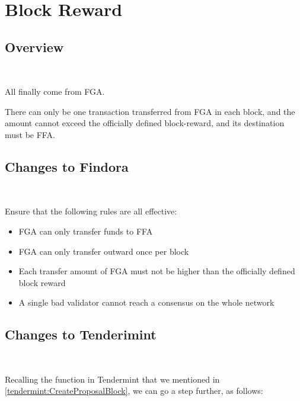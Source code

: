 \clearpage

\section{Block Reward} \label{section:reward}

\subsection{Overview}

~\par

All  finally come from FGA.

There can only be one transaction transferred from FGA in each block,
and the amount cannot exceed the officially defined block-reward,
and its destination must be FFA.

\subsection{Changes to Findora}

~\par

Ensure that the following rules are all effective:

\begin{itemize}
    \item FGA can only transfer funds to FFA
    \item FGA can only transfer outward once per block
    \item Each transfer amount of FGA must not be higher than the officially defined block reward
    \item A single bad validator cannot reach a consensus on the whole network
\end{itemize}

\clearpage

\subsection{Changes to Tenderimint}

~\par

Recalling the  function in Tendermint that we mentioned in \ref{tendermint:CreateProposalBlock},
we can go a step further, as follows:

